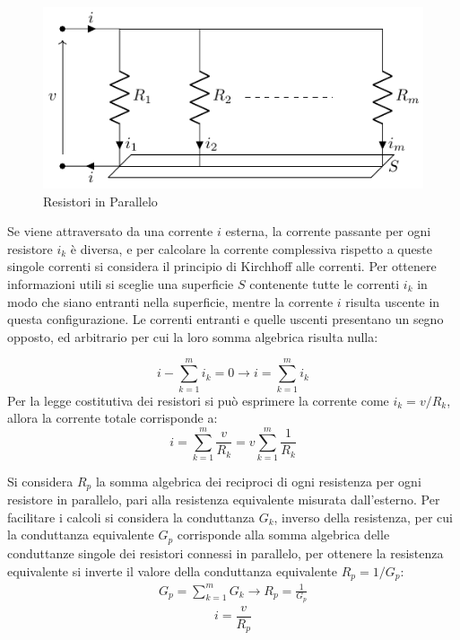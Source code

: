 \documentclass{article}
\numberwithin{equation}{subsection}
\begin{document}
\begin{figure}[H]%
    \centering
    \includegraphics{resistori-parallelo.pdf}%
    \caption{Resistori in Parallelo}%
    \label{fig:resistori-parallelo}
\end{figure}

Se viene attraversato da una corrente $i$ esterna, la corrente passante per ogni resistore $i_k$ è diversa, e per calcolare la corrente complessiva rispetto a queste singole 
correnti si considera il principio di Kirchhoff alle correnti. Per ottenere informazioni utili si sceglie una superficie $S$ contenente tutte le correnti $i_k$ in modo che 
siano entranti nella superficie, mentre la corrente $i$ risulta uscente in questa configurazione. Le correnti entranti e quelle uscenti presentano un segno opposto, ed 
arbitrario per cui la loro somma algebrica risulta nulla:

\begin{equation*}
    i-\displaystyle\sum_{k=1}^mi_k=0\to i=\sum_{k=1}^mi_k
\end{equation*}
Per la legge costitutiva dei resistori si può esprimere la corrente come $i_k={v}/{R_k}$, allora la corrente totale corrisponde a: 
\begin{equation*}
    i=\displaystyle\sum_{k=1}^m\frac{v}{R_k}=v\sum_{k=1}^m\frac{1}{R_k}
\end{equation*}

Si considera $R_p$ la somma algebrica dei reciproci di ogni resistenza per ogni resistore in parallelo, pari alla resistenza equivalente misurata dall'esterno. Per 
facilitare i calcoli si considera la conduttanza $G_k$, inverso della resistenza, per cui la conduttanza equivalente $G_p$ corrisponde alla somma algebrica delle conduttanze 
singole dei resistori connessi in parallelo, per ottenere la resistenza equivalente si inverte il valore della conduttanza equivalente $R_p={1}/{G_p}$: 
\begin{gather*}
    G_p=\displaystyle\sum_{k=1}^mG_k\to R_p=\displaystyle\frac{1}{G_p}
\end{gather*} 
\begin{equation}
    i=\displaystyle\frac{v}{R_p}
\end{equation}
\end{document}
